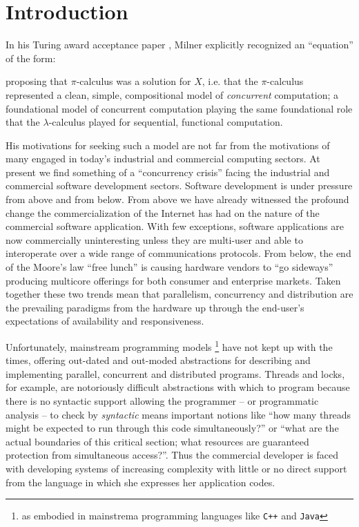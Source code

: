 \section{Introduction}\label{sec:introduction} %

In his Turing award acceptance paper \cite{}, Milner explicitly
recognized an ``equation'' of the form:
\begin{figure}[hbp]
\end{figure}
proposing that $\pi$-calculus was a solution for $X$, i.e. that the
$\pi$-calculus represented a clean, simple, compositional model of
\emph{concurrent} computation; a foundational model of concurrent
computation playing the same foundational role that the
$\lambda$-calculus played for sequential, functional computation.

His motivations for seeking such a model are not far from the
motivations of many engaged in today's industrial and commercial
computing sectors. At present we find something of a ``concurrency
crisis'' facing the industrial and commercial software development
sectors. Software development is under pressure from above and from
below. From above we have already witnessed the profound change the
commercialization of the Internet has had on the nature of the
commercial software application. With few exceptions, software
applications are now commercially uninteresting unless they are
multi-user and able to interoperate over a wide range of communications
protocols. From below, the end of the Moore's law ``free lunch'' is
causing hardware vendors to ``go sideways'' producing multicore
offerings for both consumer and enterprise markets. Taken together
these two trends mean that parallelism, concurrency and distribution
are the prevailing paradigms from the hardware up through the
end-user's expectations of availability and responsiveness.

Unfortunately, mainstream programming models \footnote{as embodied in
  mainstrema programming languages like \texttt{C++} and
  \texttt{Java}} have not kept up with the times, offering out-dated
and out-moded abstractions for describing and implementing parallel,
concurrent and distributed programs. Threads and locks, for example,
are notoriously difficult abstractions with which to program because
there is no syntactic support allowing the programmer -- or
programmatic analysis -- to check by \emph{syntactic} means important
notions like ``how many threads might be expected to run through this
code simultaneously?'' or ``what are the actual boundaries of this
critical section; what resources are guaranteed protection from
simultaneous access?''. Thus the commercial developer is faced with
developing systems of increasing complexity with little or no direct
support from the language in which she expresses her application
codes.

